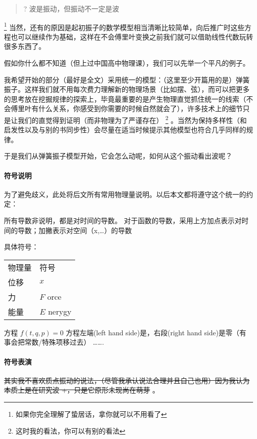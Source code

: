 \documentclass[11pt]{book}
\begin{document}
\begin{quote}
? 波是振动，但振动不一定是波
\end{quote}

\footnote{如果你完全理解了蛰居话，拿你就可以不用看了}
当然，还有的原因是起初振子的数学模型相当清晰比较简单，向后推广时这些方程也可以继续作为基础，这样在不会傅里叶变换之前我们就可以借助线性代数玩转很多东西了。

假如你什么都不知道（但上过中国高中物理课），我们可以先举一个平凡的例子。

我希望开始的部分（最好是全文）采用统一的模型：（这里至少开篇用的是）弹簧振子。这样我们就不用每次费力理解新的物理场景（比如摆、弦），而可以把更多的思考放在挖掘规律的探索上，毕竟最重要的是产生物理直觉抓住统一的线索（不会傅里叶有什么关系，你感受到你需要的时候自然就会了），许多技术上的细节只是让我们的直觉得到证明（而非物理为了严谨存在）
\footnote{这时我的看法，你可以有别的看法}
。当然为保持多样性（和启发性以及与别的书同步性）会尽量在适当时候提示其他模型也符合几乎同样的规律。

于是我们从弹簧振子模型开始，它会怎么动呢，如何从这个振动看出波呢？

\paragraph{符号说明}
为了避免歧义，此处将后文所有常用物理量说明。以后本文都将遵守这个统一的约定：

所有导数非说明，都是对时间的导数。
对于函数的导数，采用上方加点表示对时间的导数；加撇表示对空间（x,\ldots{}）的导数

具体符号：
\begin{center}
\begin{tabular}{ll}
物理量 & 符号\\[0pt]
位移 & \(x\)\\[0pt]
力 & \(F\) orce\\[0pt]
能量 & \(E\) nerygy\\[0pt]
\end{tabular}
\end{center}

方程 \(f(t,q,p)=0\)
方程左端(left hand side)是，右段(right hand side)是零（有事会把常数/特殊项移过去）
\ldots{}\ldots{}.

\paragraph{符号表演}
\sout{其实我不喜欢质点振动的说法，（尽管我承认说法合理并且自己也用）因为我认为本质上是在研究波 +，只是它原形未现尚在萌芽} 。
\end{document}
